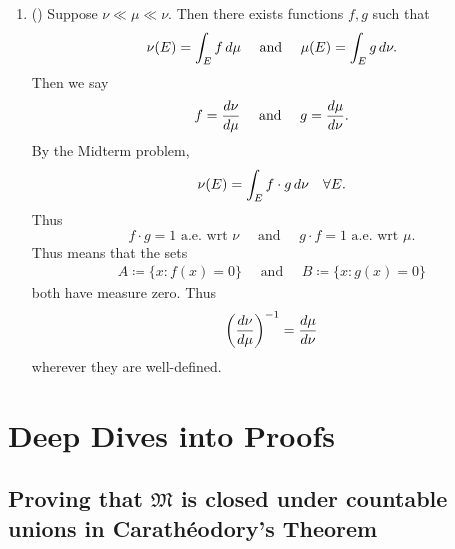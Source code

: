 \documentclass[notoc,notitlepage]{tufte-book}
\begin{document}
\begin{note}
\begin{enumerate}
    \item ()
      Suppose $\nu \ll \mu \ll \nu$.
      Then there exists functions $f, g$ such that
      \begin{equation*}
        \nu(E) = \int_{E} f \mathop{}\!d{\mu} \quad\text{ and }\quad
        \mu(E) = \int_{E} g \mathop{}\!d{\nu}.
      \end{equation*}
      Then we say
      \begin{equation*}
        f = \frac{\mathop{}\!d{\nu}}{\mathop{}\!d{\mu}} \quad\text{ and }\quad
        g = \frac{\mathop{}\!d{\mu}}{\mathop{}\!d{\nu}}.
      \end{equation*}
      By the Midterm problem, 
      \begin{equation*}
        \nu(E) = \int_{E} f \cdot g \mathop{}\!d{\nu} \quad \forall E.
      \end{equation*}
      Thus
      \begin{equation*}
        f \cdot g = 1 \text{ a.e. wrt } \nu \quad\text{ and }\quad
        g \cdot f = 1 \text{ a.e. wrt } \mu.
      \end{equation*}
      Thus means that the sets
      \begin{gather*}
        A \coloneqq \{ x : f(x) = 0 \} \quad\text{ and }\quad
        B \coloneqq \{ x : g(x) = 0 \}
      \end{gather*}
      both have measure zero.
      Thus
      \begin{equation*}
        \left( \frac{\mathop{}\!d{\nu}}{\mathop{}\!d{\mu}} \right)^{-1} = \frac{\mathop{}\!d{\mu}}{\mathop{}\!d{\nu}}
      \end{equation*}
      wherever they are well-defined.
  \end{enumerate}
\end{note}



\appendix

\chapter{Deep Dives into Proofs}%
\label{chp:deep_dives_into_proofs}

\section{Proving that \texorpdfstring{$\mathfrak{M}$}{M} is closed under countable unions in Carath\'{e}odory's Theorem}\label{sec:proving_that_m_is_closed_under_countable_unions_in_caratheodory_s_theorem}
\end{document}
